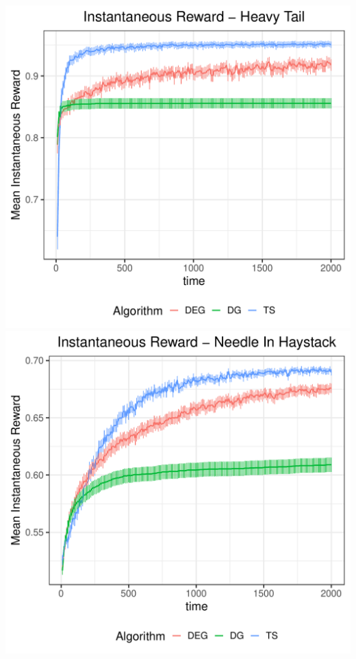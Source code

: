 \documentclass[../competing_bandits_with_appendix.tex]{subfiles}
\begin{document}
\begin{center}
\includegraphics[scale=0.35]{ec19paper/appendix_figures/mean_inst_reward_ht}
\includegraphics[scale=0.35]{ec19paper/appendix_figures/mean_inst_reward_nih}
\end{center}
\end{document}

